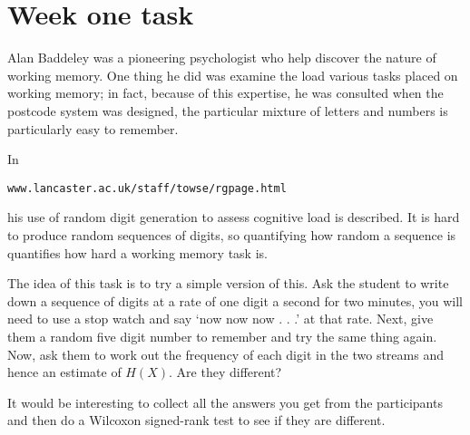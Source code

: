 \documentclass[12pt]{article}
\begin{document}
\section*{Week one task} 

Alan Baddeley was a pioneering psychologist who help discover the
nature of working memory. One thing he did was examine the load
various tasks placed on working memory; in fact, because of this
expertise, he was consulted when the postcode system was designed, the
particular mixture of letters and numbers is particularly easy to
remember.

In
\begin{center}
\texttt{www.lancaster.ac.uk/staff/towse/rgpage.html}\end{center} his use of
random digit generation to assess cognitive load is described. It is
hard to produce random sequences of digits, so quantifying how random
a sequence is quantifies how hard a working memory task is.

The idea of this task is to try a simple version of this. Ask the
student to write down a sequence of digits at a rate of one digit a
second for two minutes, you will need to use a stop watch and say `now
now now . . .' at that rate. Next, give them a random five digit
number to remember and try the same thing again. Now, ask them to work
out the frequency of each digit in the two streams and hence an
estimate of $H(X)$. Are they different?

It would be interesting to collect all the answers you get from the
participants and then do a Wilcoxon signed-rank test to see if they
are different.
\end{document}
